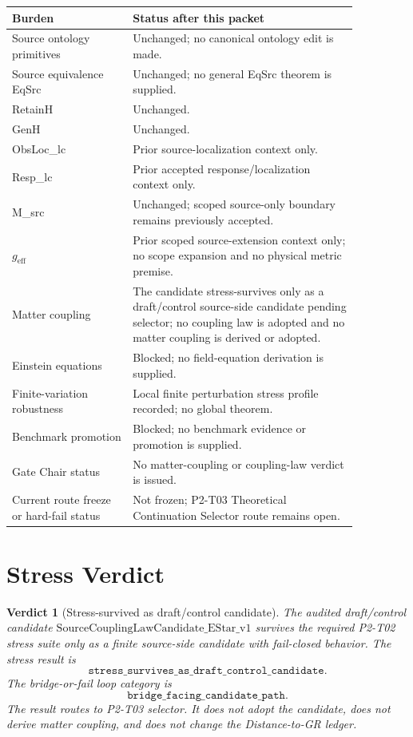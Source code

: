 \documentclass[11pt]{article}
\newtheorem{verdict}{Verdict}
\begin{document}
\begin{longtable}{p{0.30\linewidth}p{0.56\linewidth}}
\toprule
Burden & Status after this packet \\
\midrule
Source ontology primitives & Unchanged; no canonical ontology edit is made. \\
Source equivalence EqSrc & Unchanged; no general EqSrc theorem is supplied. \\
RetainH & Unchanged. \\
GenH & Unchanged. \\
ObsLoc\_lc & Prior source-localization context only. \\
Resp\_lc & Prior accepted response/localization context only. \\
M\_src & Unchanged; scoped source-only boundary remains previously accepted. \\
\(g_{\mathrm{eff}}\) & Prior scoped source-extension context only; no scope expansion and no physical metric premise. \\
Matter coupling & The candidate stress-survives only as a draft/control source-side candidate pending selector; no coupling law is adopted and no matter coupling is derived or adopted. \\
Einstein equations & Blocked; no field-equation derivation is supplied. \\
Finite-variation robustness & Local finite perturbation stress profile recorded; no global theorem. \\
Benchmark promotion & Blocked; no benchmark evidence or promotion is supplied. \\
Gate Chair status & No matter-coupling or coupling-law verdict is issued. \\
Current route freeze or hard-fail status & Not frozen; P2-T03 Theoretical Continuation Selector route remains open. \\
\bottomrule
\end{longtable}

\section{Stress Verdict}

\begin{verdict}[Stress-survived as draft/control candidate]
The audited draft/control candidate
\(\mathrm{SourceCouplingLawCandidate\_EStar\_v1}\) survives the required P2-T02
stress suite only as a finite source-side candidate with fail-closed behavior.
The stress result is
\[
  \texttt{stress\_survives\_as\_draft\_control\_candidate}.
\]
The bridge-or-fail loop category is
\[
  \texttt{bridge\_facing\_candidate\_path}.
\]
The result routes to P2-T03 selector. It does not adopt the candidate, does not
derive matter coupling, and does not change the Distance-to-GR ledger.
\end{verdict}
\end{document}
